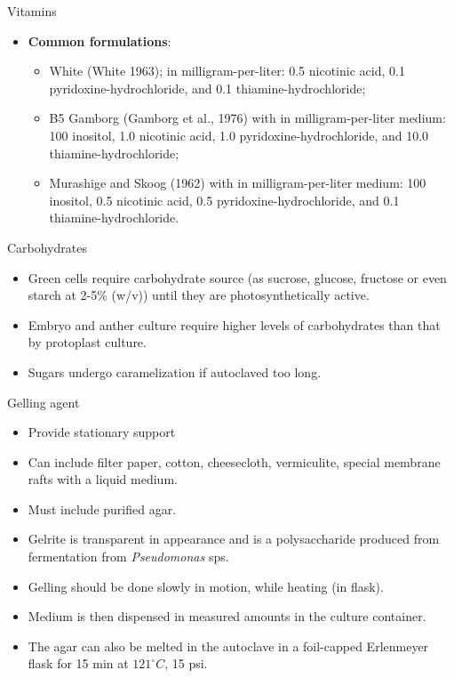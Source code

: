 \documentclass[ignorenonframetext,aspectratio=169]{beamer}
\providecommand{\tightlist}{%
  \setlength{\itemsep}{0pt}\setlength{\parskip}{0pt}}
\begin{document}
\begin{frame}{Vitamins}
\protect\hypertarget{vitamins-1}{}

\begin{itemize}
\item
  \textbf{Common formulations}:

  \begin{itemize}
  \tightlist
  \item
    White (White 1963); in milligram-per-liter: 0.5 nicotinic acid, 0.1
    pyridoxine-hydrochloride, and 0.1 thiamine-hydrochloride;
  \item
    B5 Gamborg (Gamborg et al., 1976) with in milligram-per-liter
    medium: 100 inositol, 1.0 nicotinic acid, 1.0
    pyridoxine-hydrochloride, and 10.0 thiamine-hydrochloride;
  \item
    Murashige and Skoog (1962) with in milligram-per-liter medium: 100
    inositol, 0.5 nicotinic acid, 0.5 pyridoxine-hydrochloride, and 0.1
    thiamine-hydrochloride.
  \end{itemize}
\end{itemize}

\end{frame}

\begin{frame}{Carbohydrates}
\protect\hypertarget{carbohydrates}{}

\begin{itemize}
\tightlist
\item
  Green cells require carbohydrate source (as sucrose, glucose, fructose
  or even starch at 2-5\% (w/v)) until they are photosynthetically
  active.
\item
  Embryo and anther culture require higher levels of carbohydrates than
  that by protoplast culture.
\item
  Sugars undergo caramelization if autoclaved too long.
\end{itemize}

\end{frame}

\begin{frame}{Gelling agent}
\protect\hypertarget{gelling-agent}{}

\begin{itemize}
\tightlist
\item
  Provide stationary support
\item
  Can include filter paper, cotton, cheesecloth, vermiculite, special
  membrane rafts with a liquid medium.
\item
  Must include \alert{purified} agar.
\item
  Gelrite is transparent in appearance and is a polysaccharide produced
  from fermentation from \emph{Pseudomonas} sps.
\item
  Gelling should be done slowly in motion, while heating (in flask).
\item
  Medium is then dispensed in measured amounts in the culture container.
\item
  The agar can also be melted in the autoclave in a foil-capped
  Erlenmeyer flask for 15 min at \(121^\circ C\), 15 psi.
\end{itemize}

\end{frame}
\end{document}
